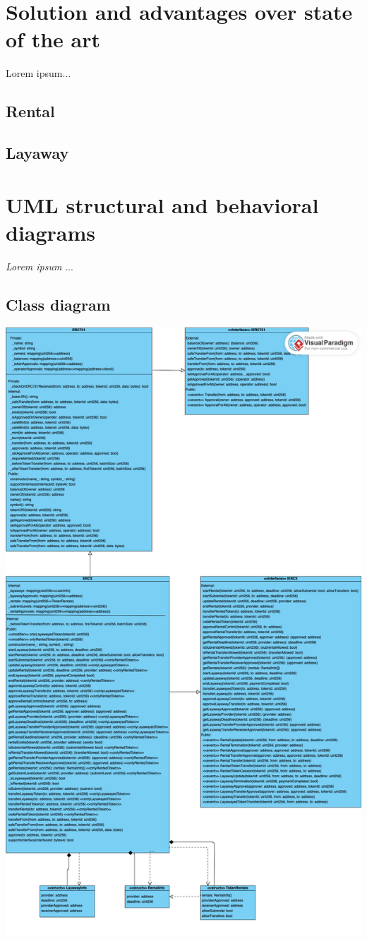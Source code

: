 \documentclass[english, LaM, oneside]{sapthesis}%
\begin{document}
\section{Solution and advantages over state of the art}
Lorem ipsum...
\subsection{Rental}
\subsection{Layaway}

\section{UML structural and behavioral diagrams}
\label{sec:moons}
\textit{Lorem ipsum} ... \cite{ref:science}

\subsection{Class diagram}
\includegraphics[scale=0.3]{classDiagram.png}
\end{document}
